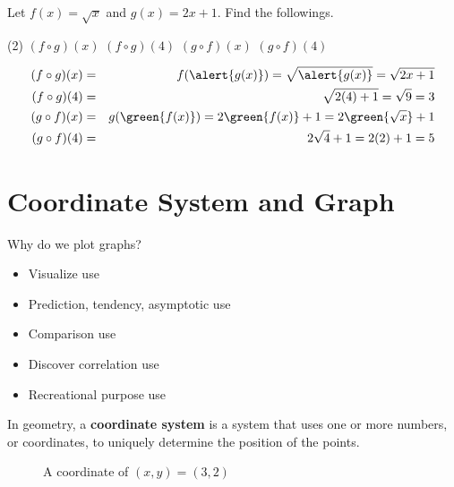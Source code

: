 \begin{frame}[t]
\begin{ex}
Let $f(x) = \sqrt{x} $ and $g(x) = 2x+1$. Find the followings.
\begin{tasks}(2)
\task $(f \circ g)(x)$
\task $(f \circ g)(4)$
\task $(g \circ f)(x)$
\task $(g \circ f)(4)$
\end{tasks}
\end{ex}
\begin{sol}
\begin{eqnarray*}
(f \circ g)(x)  &=& f(\alert{g(x)}) = \sqrt{\alert{g(x)}}  = \sqrt{2x+1} \\ 
(f \circ g)(4)  &=& \sqrt{2(4) + 1 }  = \sqrt{9}  = 3 \\ 
(g \circ f)(x)  &=& g(\green{f(x)})  = 2\green{f(x)}+1  = 2\green{\sqrt{x}} + 1 \\ 
(g \circ f)(4)  &=& 2\sqrt{4} + 1  =  2(2) + 1  = 5
\end{eqnarray*}
\end{sol}
\end{frame}


\section[Coordinate]{Coordinate System and Graph}
\frame{\sectionpage}

\begin{frame}
\begin{block}{Why do we plot graphs?}
\begin{itemize}
\item Visualize use 
\item Prediction, tendency, asymptotic use
\item Comparison use
\item Discover correlation use
\item Recreational purpose use
\end{itemize}
\end{block}

\begin{defn}{}{}
In geometry, a \textbf{coordinate system} is a system that uses one or more numbers, or coordinates, to uniquely determine the position of the points.
\end{defn}
\end{frame}

\begin{frame}
\begin{figure}[h!]
\caption{A coordinate of $(x,y) = (3,2)$}
\end{figure}
\end{frame}

